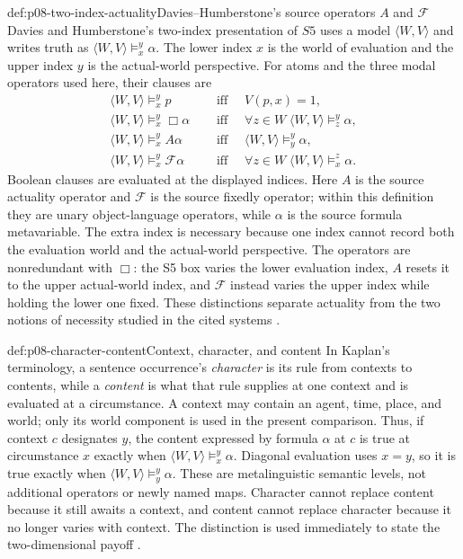 \begin{hbdefinition}{def:p08-two-index-actuality}{Davies--Humberstone's source operators \(A\) and \(\mathcal F\)}
Davies and Humberstone's two-index presentation of \(S5\) uses a
model \(\langle W,V\rangle\) and writes truth as
\(\langle W,V\rangle\models_x^y\alpha\).  The lower index \(x\) is the
world of evaluation and the upper index \(y\) is the actual-world
perspective.  For atoms and the three modal operators used here, their clauses
are
\[
\begin{aligned}
 \langle W,V\rangle\models_x^y p
 &\quad\text{ iff }\quad V(p,x)=1,\\
 \langle W,V\rangle\models_x^y\Box\alpha
 &\quad\text{ iff }\quad
   \forall z\in W\;\langle W,V\rangle\models_z^y\alpha,\\
 \langle W,V\rangle\models_x^y A\alpha
 &\quad\text{ iff }\quad
   \langle W,V\rangle\models_y^y\alpha,\\
 \langle W,V\rangle\models_x^y\mathcal F\alpha
 &\quad\text{ iff }\quad
   \forall z\in W\;\langle W,V\rangle\models_x^z\alpha.
\end{aligned}
\]
Boolean clauses are evaluated at the displayed indices.  Here \(A\) is the
source actuality operator and \(\mathcal F\) is the source fixedly operator;
within this definition they are unary object-language operators, while
\(\alpha\) is the source formula metavariable.  The extra index is necessary
because one index cannot record both the evaluation world and the actual-world
perspective.  The operators are nonredundant with \(\Box\): the S5 box varies
the lower evaluation index, \(A\) resets it to the upper actual-world index,
and \(\mathcal F\) instead varies the upper index while holding the lower one
fixed.  These distinctions separate actuality from the two notions of
necessity studied in the cited systems
\cite{CrossleyHumberstone1977,DaviesHumberstone1980}.
\end{hbdefinition}

\begin{hbdefinition}{def:p08-character-content}{Context, character, and content}
In Kaplan's terminology, a sentence occurrence's \emph{character} is its rule
from contexts to contents, while a \emph{content} is what that rule supplies at
one context and is evaluated at a circumstance.  A context may contain an
agent, time, place, and world; only its world component is used in the present
comparison.  Thus, if context \(c\) designates \(y\), the content expressed by
formula \(\alpha\) at \(c\) is true at circumstance \(x\) exactly when
\(\langle W,V\rangle\models_x^y\alpha\).  Diagonal evaluation uses \(x=y\),
so it is true exactly when
\(\langle W,V\rangle\models_y^y\alpha\).  These are metalinguistic semantic
levels, not additional operators or newly named maps.  Character cannot replace
content because it still awaits a context, and content cannot replace character
because it no longer varies with context.  The distinction is used immediately
to state the two-dimensional payoff \cite{Kaplan1989}.
\end{hbdefinition}

